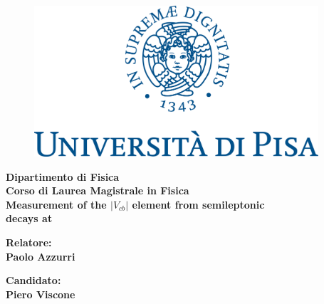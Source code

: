 \begin{titlepage} %
    \begin{figure}[h!] %
        \centering\includegraphics[width=0.94\textwidth]{fig/Frontespizio/marchio_unipi_pant541.png}
    \end{figure}
    
    \vspace{10mm}
    
    \begin{Large}
     \begin{center}
        \textbf{Dipartimento di Fisica\\ Corso di Laurea Magistrale in Fisica\\}
        \vspace{20mm}
        {    {\Huge{\textbf{Measurement of the $|V_{cb}|$ \CKM element from \ttbar semileptonic \\ \vspace{3mm} decays at \CMS} }}}\\
    \end{center}
    \end{Large}
    
    
    \vspace{28mm}
    \begin{minipage}[t]{0.47\textwidth}
        {\large{\textbf {Relatore:\\ Paolo Azzurri}}}
    \end{minipage}
    \hfill
    \begin{minipage}[t]{0.47\textwidth}\raggedleft
        {\large{\textbf {Candidato:\\ Piero Viscone}}}
    \end{minipage}
    
    \vspace{28mm}
    
    \hrulefill
    
    \vspace{5mm}
    
    
    \end{titlepage}
 